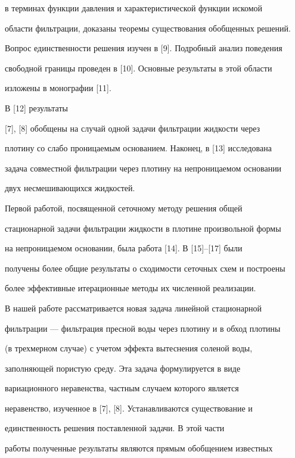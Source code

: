 в терминах функции давления и характеристической функции искомой


области фильтрации, доказаны теоремы существования обобщенных решений.


Вопрос единственности решения изучен в [9]. Подробный анализ поведения


свободной границы проведен в [10]. Основные результаты в этой области


изложены в монографии [11].





В [12] результаты


[7], [8] обобщены на случай одной задачи фильтрации жидкости через


плотину со слабо проницаемым основанием. Наконец, в [13] исследована


задача совместной фильтрации через плотину на непроницаемом основании


двух несмешивающихся жидкостей.





Первой работой, посвященной сеточному методу решения общей


стационарной задачи фильтрации жидкости в плотине произвольной формы


на непроницаемом основании, была работа [14]. В [15]--[17] были


получены более общие результаты о сходимости сеточных схем и построены


более эффективные итерационные методы их численной реализации.





В нашей работе рассматривается новая задача линейной стационарной


фильтрации --- фильтрация пресной воды через плотину и в обход плотины


(в трехмерном случае) с учетом эффекта вытеснения соленой воды,


заполняющей пористую среду. Эта задача формулируется в виде


вариационного неравенства, частным случаем которого является


неравенство, изученное в [7], [8]. Устанавливаются существование и


единственность решения поставленной задачи. В этой части


работы полученные результаты являются прямым обобщением известных


